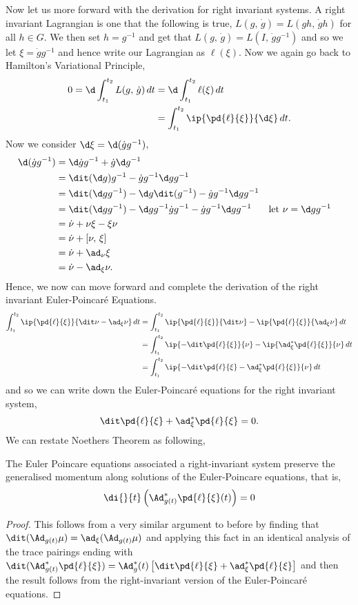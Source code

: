 \noindent
  Now let us more forward with the derivation for right invariant systems. A right invariant Lagrangian is one that the following is true, $L(g,\,\dot g) = L(gh,\,\dot gh)$ for all $h \in G$. We then set $h = g^{-1}$ and get that $L(g,\,\dot g) = L(I,\,\dot gg^{-1})$ and so we let $\xi = \dot gg^{-1}$ and hence write our Lagrangian as $\ell(\xi)$. Now we again go back to Hamilton's Variational Principle,
  \begin{align*}
    0 = \d\int_{t_1}^{t_2} L(g,\,\dot g)\,dt &= \d\int_{t_1}^{t_2} \ell(\xi)\,dt\\
    &= \int_{t_1}^{t_2} \ip{\pd{\ell}{\xi}}{\d\xi}\,dt.
  \end{align*}
  Now we consider $\d\xi = \d(\dot g g^{-1})$,
  \begin{align*}
    \d(\dot g g^{-1}) &= \d\dot g g^{-1} + \dot g\d g^{-1} \\
    &= \dit(\d g)g^{-1} - \dot g g^{-1}\d gg^{-1}\\
    &= \dit(\d g g^{-1}) - \d g\dit(g^{-1}) - \dot g g^{-1}\d gg^{-1}\\
    &= \dit(\d g g^{-1}) - \d gg^{-1}\dot g g^{-1} - \dot g g^{-1}\d gg^{-1} && \text{let $\nu = \d gg^{-1}$}\\
    &= \dot\nu + \nu\xi - \xi\nu \\
    &= \dot\nu + [\nu,\,\xi] \\
    &= \dot \nu + \ad_\nu\xi \\
    &= \dot\nu - \ad_\xi\nu.
  \end{align*}
  Hence, we now can move forward and complete the derivation of the right invariant Euler-Poincar\'e Equations.
  \begin{align*}
    \int_{t_1}^{t_2} \ip{\pd{\ell}{\xi}}{\dit\nu - \ad_\xi\nu}\,dt &= \int_{t_1}^{t_2} \ip{\pd{\ell}{\xi}}{\dit\nu} - \ip{\pd{\ell}{\xi}}{\ad_\xi\nu}\,dt \\
    &= \int_{t_1}^{t_2} \ip{-\dit\pd{\ell}{\xi}}{\nu} - \ip{\ad^*_\xi\pd{\ell}{\xi}}{\nu}\,dt \\
    &= \int_{t_1}^{t_2} \ip{-\dit\pd{\ell}{\xi} -\ad^*_\xi\pd{\ell}{\xi}}{\nu}\,dt
  \end{align*}
  and so we can write down the Euler-Poincar\'e equations for the right invariant system,
  $$ \dit\pd{\ell}{\xi} + \ad^*_\xi \pd{\ell}{\xi} = 0. $$
  We can restate Noethers Theorem as following,
  \begin{nthm}
    The Euler Poincare equations associated a right-invariant system preserve the generalised momentum along solutions of the Euler-Poincare equations, that is,
    $$ \di{}{t} \left(\Ad^*_{g(t)}\pd{\ell}{\xi}(t)\right) = 0 $$
  \end{nthm}
  \begin{proof}
    This follows from a very similar argument to before by finding that $\dit (\Ad_{g(t)}\mu) = \ad_\xi (\Ad_{g(t)}\mu)$ and applying this fact in an identical analysis of the trace pairings ending with $\dit(\Ad_{g(t)}^*\pd{\ell}{\xi}) = \Ad^*_g(t)\left[ \dit\pd{\ell}{\xi} + \ad_\xi^* \pd{\ell}{\xi} \right]$ and then the result follows from the right-invariant version of the Euler-Poincar\'e equations.
  \end{proof}
